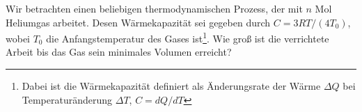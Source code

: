 \begin{Exercise}[origin = 200 Puzzling Physics Problems, title = Temperaturabhängige Wärmekapazität, difficulty = 4, label = expansion]
Wir betrachten einen beliebigen thermodynamischen Prozess, der mit $n$ Mol Heliumgas arbeitet. Desen Wärmekapazität sei gegeben durch $C = 3RT/(4T_0)$, wobei $T_0$ die Anfangstemperatur des Gases ist\footnote{Dabei ist die Wärmekapazität definiert als Änderungsrate der Wärme $\Delta Q$ bei Temperaturänderung $\Delta T$, $C = dQ/dT$}. Wie groß ist die verrichtete Arbeit bis das Gas sein minimales Volumen erreicht?
\end{Exercise}